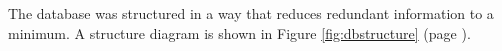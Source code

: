 The database was structured in a way that reduces redundant information to a
minimum. A structure diagram is shown in Figure \ref{fig:dbstructure} (page
\pageref{fig:dbstructure}). 


